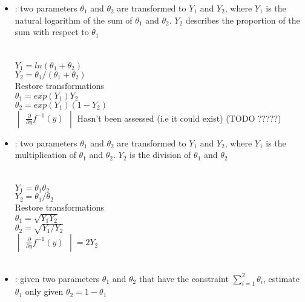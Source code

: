 \begin{itemize}
\item {} : two parameters $\theta_1$ and $\theta_2$ are transformed to $Y_1$ and $Y_2$, where $Y_1$ is the natural logarithm of the sum of $\theta_1$ and $\theta_2$. $Y_2$ describes the proportion of the sum with respect to $\theta_1$\\
\\
\\
$Y_1 = ln(\theta_1 + \theta_2)$\\
$Y_2 = \theta_1 / (\theta_1 + \theta_2)$\\
Restore transformations\\
$\theta_1 = exp(Y_1)Y_2$\\
$\theta_2 =exp(Y_1)(1 - Y_2)$\\
$\begin{vmatrix} \frac{\partial}{\partial y} f^{-1}(y) \end{vmatrix}$ Hasn't been assessed (i.e it could exist) (TODO ?????)\\

\item {} : two parameters $\theta_1$ and $\theta_2$ are transformed to $Y_1$ and $Y_2$, where $Y_1$ is the multiplication of $\theta_1$ and $\theta_2$. $Y_2$ is the division of $\theta_1$ and $\theta_2$\\
\\
\\
$Y_1 = \theta_1 \theta_2$\\
$Y_2 = \theta_1 / \theta_2$\\
Restore transformations\\
$\theta_1 = \sqrt{Y_1 Y_2}$\\
$\theta_2 = \sqrt{Y_1 / Y_2}$\\
$\begin{vmatrix} \frac{\partial}{\partial y} f^{-1}(y) \end{vmatrix} = 2Y_2$\\\\

\item {} : given two parameters $\theta_1$ and $\theta_2$ that have the constraint $\sum_{i = 1}^2\theta_i$, estimate $\theta_1$ only given $\theta_2 = 1 - \theta_1$\\
\\
\\
\end{itemize}
